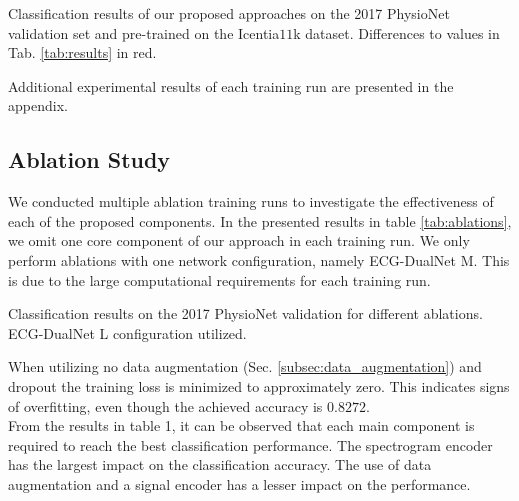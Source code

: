 \begin{table}[!ht]
    \centering
    \caption{Classification results of our proposed approaches on the 2017 PhysioNet validation set and pre-trained on the Icentia$11$k dataset. Differences to values in Tab. \ref{tab:results} in red.}
    
    \label{tab:pretraining_results}
\end{table}

Additional experimental results of each training run are presented in the appendix.

\subsection{Ablation Study} \label{subsec:ablations}

We conducted multiple ablation training runs to investigate the effectiveness of each of the proposed components. In the presented results in table \ref{tab:ablations}, we omit one core component of our approach in each training run. We only perform ablations with one network configuration, namely ECG-DualNet M. This is due to the large computational requirements for each training run.

\begin{table}[!ht]
    \centering
    \caption{Classification results on the 2017 PhysioNet validation for different ablations. ECG-DualNet L configuration utilized.}
    
    \label{tab:ablations}
\end{table}

When utilizing no data augmentation (Sec. \ref{subsec:data_augmentation}) and dropout the training loss is minimized to approximately zero. This indicates signs of overfitting, even though the achieved accuracy is $0.8272$.\\
\indent From the results in table 1, it can be observed that each main component is required to reach the best classification performance. The spectrogram encoder has the largest impact on the classification accuracy. The use of data augmentation and a signal encoder has a lesser impact on the performance. 
